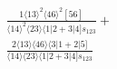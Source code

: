 \documentclass[varwidth, border=5pt]{standalone}
\begin{document}
\begin{my}
$\begin{gathered}
\scriptscriptstyle\frac{1⟨13⟩^2⟨46⟩^2[56]}{⟨14⟩^2⟨23⟩⟨1|2+3|4]s_{123}}+\\
\scriptscriptstyle\frac{2⟨13⟩⟨46⟩⟨3|1+2|5]}{⟨14⟩⟨23⟩⟨1|2+3|4]s_{123}}\phantom{+}
\end{gathered}$
\end{my}
\end{document}
